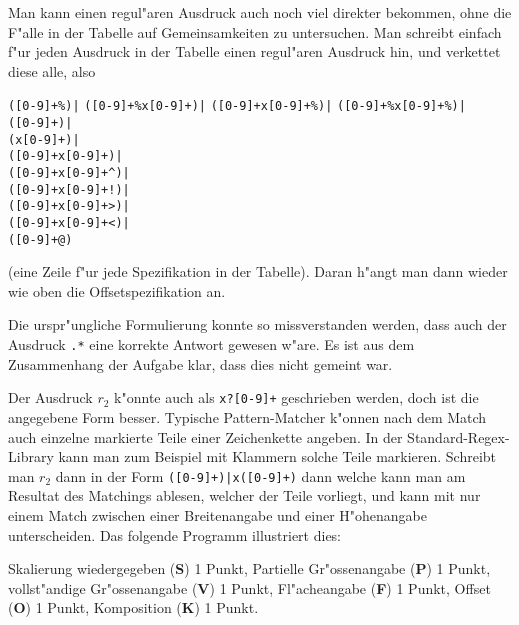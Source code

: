 \begin{loesung}
Man kann einen regul"aren Ausdruck auch noch viel direkter bekommen, ohne
die F"alle in der Tabelle auf Gemeinsamkeiten zu untersuchen.
Man schreibt einfach f"ur jeden Ausdruck in der Tabelle einen regul"aren
Ausdruck hin, und verkettet diese alle, also
\begin{center}
\texttt{([0-9]+\%)|}
\texttt{([0-9]+\%x[0-9]+)|}
\texttt{([0-9]+x[0-9]+\%)|}
\texttt{([0-9]+\%x[0-9]+\%)|}
\\
\texttt{([0-9]+)|}
\\
\texttt{(x[0-9]+)|}
\\
\texttt{([0-9]+x[0-9]+)|}
\\
\texttt{([0-9]+x[0-9]+\^{})|}
\\
\texttt{([0-9]+x[0-9]+!)|}
\\
\texttt{([0-9]+x[0-9]+>)|}
\\
\texttt{([0-9]+x[0-9]+<)|}
\\
\texttt{([0-9]+@)}
\end{center}
(eine Zeile f"ur jede Spezifikation in der Tabelle).
Daran h"angt man dann wieder wie oben die Offset\-spezifikation an.
\end{loesung}

\begin{diskussion}
Die urspr"ungliche Formulierung konnte so missverstanden werden, dass auch
der Ausdruck \texttt{.*} eine korrekte Antwort gewesen w"are.
Es ist aus dem Zusammenhang der Aufgabe klar, dass dies nicht gemeint war.
\end{diskussion}

\begin{diskussion}
Der Ausdruck $r_2$ k"onnte auch als \texttt{x?[0-9]+} geschrieben werden,
doch ist die angegebene Form besser.
Typische Pattern-Matcher k"onnen nach dem Match auch einzelne markierte
Teile einer Zeichenkette angeben.
In der Standard-Regex-Library kann man zum Beispiel mit Klammern solche
Teile markieren.
Schreibt man $r_2$ dann in der Form \texttt{([0-9]+)|x([0-9]+)}
dann welche kann man am Resultat des Matchings ablesen, welcher der
Teile vorliegt, und kann mit nur einem Match zwischen einer Breitenangabe
und einer H"ohenangabe unterscheiden. Das folgende Programm illustriert dies:
{\small
{}
}
\end{diskussion}

\begin{bewertung}
Skalierung wiedergegeben ({\bf S}) 1 Punkt,
Partielle Gr"ossenangabe ({\bf P}) 1 Punkt,
vollst"andige Gr"ossenangabe ({\bf V}) 1 Punkt,
Fl"acheangabe ({\bf F}) 1 Punkt,
Offset ({\bf O}) 1 Punkt,
Komposition ({\bf K}) 1 Punkt.
\end{bewertung}
